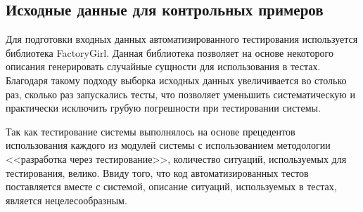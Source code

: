 \subsection{Исходные данные для контрольных примеров}

Для подготовки входных данных автоматизированного тестирования используется библиотека FactoryGirl. Данная библиотека позволяет на основе некоторого описания генерировать случайные сущности для использования в тестах. Благодаря такому подходу выборка исходных данных увеличивается во столько раз, сколько раз запускались тесты, что позволяет уменьшить систематическую и практически исключить грубую погрешности при тестировании системы.

Так как тестирование системы выполнялось на основе прецедентов использования каждого из модулей системы с использованием методологии <<разработка через тестирование>>, количество ситуаций, используемых для тестирования, велико. Ввиду того, что код автоматизированных тестов поставляется вместе с системой, описание ситуаций, используемых в тестах, является нецелесообразным.
